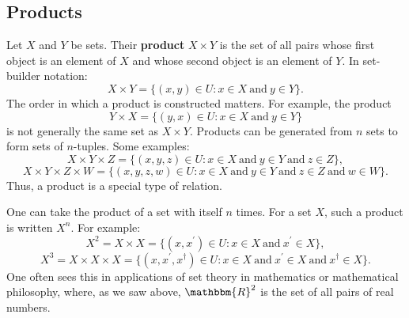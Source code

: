 \documentclass[11pt]{article}
\theoremstyle{definition}
\theoremstyle{remark}
\begin{document}
\subsection{Products}
Let $X$ and $Y$ be sets. Their \textbf{product} $X\times Y$ is the set of all pairs whose first object is an element of $X$ and whose second object is an element of $Y$. In set-builder notation:
$$X\times Y = \{(x,y)\in U: x\in X \ \text{and} \ y\in Y\}.$$
The order in which a product is constructed matters. For example, the product 
$$Y\times X = \{(y,x)\in U:x\in X \ \text{and} \ y\in Y\}$$ 
is not generally the same set as $X\times Y$. Products can be generated from $n$ sets to form sets of $n$-tuples. Some examples: 
$$X\times Y \times Z = \{(x,y,z)\in U:x\in X \ \text{and} \ y\in Y \ \text{and} \ z\in Z\},$$
$$X\times Y \times Z \times W = \{(x,y,z,w)\in U:x\in X \ \text{and} \ y\in Y \ \text{and} \ z\in Z \ \text{and} \ w\in W\}.$$
Thus, a product is a special type of relation.\par

One can take the product of a set with itself $n$ times. For a set $X$, such a product is written $X^{n}$. For example:
$$X^{2} = X\times X = \{(x,x^{\prime})\in U:x\in X \ \text{and} \ x^{\prime}\in X\},$$
$$X^{3} = X\times X\times X = \{(x,x^{\prime},x^{\dagger})\in U:x\in X \ \text{and} \ x^{\prime}\in X \ \text{and} \ x^{\dagger}\in X\}.$$
One often sees this in applications of set theory in mathematics or mathematical philosophy, where, as we saw above, $\mathbbm{R}^{2}$ is the set of all pairs of real numbers.
\end{document}
